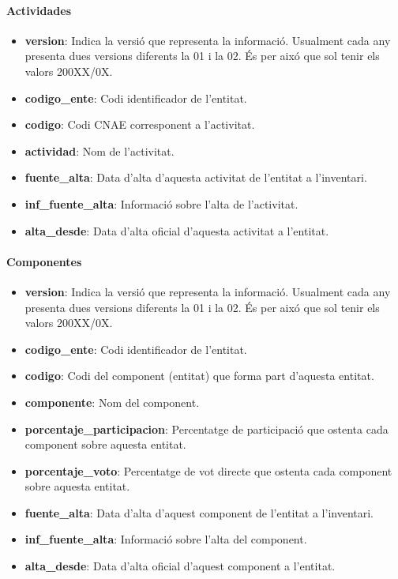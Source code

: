 \documentclass[12pt]{article}
\begin{document}
\paragraph{Actividades\\}
\begin{itemize}
    \item \textbf{version}: Indica la versió que representa la informació. Usualment cada any presenta dues versions diferents la 01 i la 02. És per aixó que sol tenir els valors 200XX/0X.
    \item \textbf{codigo\_ente}: Codi identificador de l'entitat.
    \item \textbf{codigo}: Codi CNAE corresponent a l'activitat.
    \item \textbf{actividad}: Nom de l'activitat.
    \item \textbf{fuente\_alta}: Data d'alta d'aquesta activitat de l'entitat a l'inventari.
    \item \textbf{inf\_fuente\_alta}: Informació sobre l'alta de l'activitat.
    \item \textbf{alta\_desde}: Data d'alta oficial d'aquesta activitat a l'entitat.
\end{itemize}

\paragraph{Componentes\\}
\begin{itemize}
    \item \textbf{version}: Indica la versió que representa la informació. Usualment cada any presenta dues versions diferents la 01 i la 02. És per aixó que sol tenir els valors 200XX/0X.
    \item \textbf{codigo\_ente}: Codi identificador de l'entitat.
    \item \textbf{codigo}: Codi del component (entitat) que forma part d'aquesta entitat.
    \item \textbf{componente}: Nom del component.
    \item \textbf{porcentaje\_participacion}: Percentatge de participació que ostenta cada component sobre aquesta entitat.
    \item \textbf{porcentaje\_voto}: Percentatge de vot directe que ostenta cada component sobre aquesta entitat.
    \item \textbf{fuente\_alta}: Data d'alta d'aquest component de l'entitat a l'inventari.
    \item \textbf{inf\_fuente\_alta}: Informació sobre l'alta del component.
    \item \textbf{alta\_desde}: Data d'alta oficial d'aquest component a l'entitat.
\end{itemize}
\end{document}
